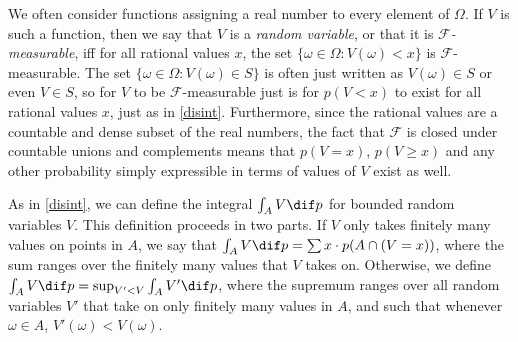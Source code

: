 We often consider functions assigning a real number to every element of $\Omega$. If $V$ is such a function, then we say that $V$ is a \textit{random variable}, or that it is \textit{$\mathcal{F}$-measurable}, iff for all rational values $x$, the set $\{\omega\in\Omega\colon V(\omega)<x\}$ is $\mathcal{F}$-measurable. The set $\{\omega\in\Omega\colon V(\omega)\in S\}$ is often just written as $V(\omega)\in S$ or even $V\in S$, so for $V$ to be $\mathcal{F}$-measurable just is for $p(V<x)$ to exist for all rational values $x$, just as in \autoref{disint}. Furthermore, since the rational values are a countable and dense subset of the real numbers, the fact that $\mathcal{F}$ is closed under countable unions and complements means that $p(V=x)$, $p(V\geq x)$ and any other probability simply expressible in terms of values of $V$ exist as well.

As in \autoref{disint}, we can define the integral $\int_A V \dif p$ for bounded random variables $V$. This definition proceeds in two parts. If $V$ only takes finitely many values on points in $A$, we say that $\int_A V \dif p={\sum x\cdot p(A\cap (V=x))}$, where the sum ranges over the finitely many values that $V$ takes on. Otherwise, we define $\int_A V \dif p=\sup_{V'<V}\int_A V' \dif p$, where the supremum ranges over all random variables $V'$ that take on only finitely many values in $A$, and such that whenever $\omega\in A$, $V'(\omega)<V(\omega)$.

